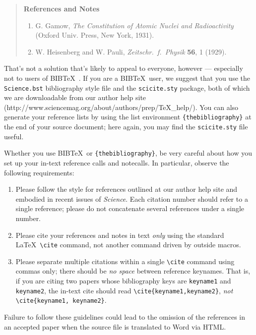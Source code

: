 \documentclass[12pt]{article}
\theoremstyle{plain}
\theoremstyle{definition}
\theoremstyle{remark}
\begin{document}
\begin{quote}
{\bf References and Notes}

\begin{enumerate}
\item G. Gamow, {\it The Constitution of Atomic Nuclei and
Radioactivity\/} (Oxford Univ. Press, New York, 1931).
\item W. Heisenberg and W. Pauli, {\it Zeitschr.\ f.\ Physik} {\bf 56},
1 (1929).
\end{enumerate}
\end{quote}

That's not a solution that's likely to appeal to everyone, however ---
especially not to users of B{\small{IB}}\TeX\ \cite{inclme}.  If you
are a B{\small{IB}}\TeX\ user, we suggest that you use the
\texttt{Science.bst} bibliography style file and the
\texttt{scicite.sty} package, both of which we are downloadable from our author help site
(http://www.sciencemag.org/about/authors/prep/TeX\_help/).  You can also
generate your reference lists by using the list environment
\texttt{\{thebibliography\}} at the end of your source document; here
again, you may find the \texttt{scicite.sty} file useful.

Whether you use B{\small{IB}}\TeX\ or \texttt{\{thebibliography\}}, be
very careful about how you set up your in-text reference calls and
notecalls.  In particular, observe the following requirements:

\begin{enumerate}
\item Please follow the style for references outlined at our author
  help site and embodied in recent issues of {\it Science}.  Each
  citation number should refer to a single reference; please do not
  concatenate several references under a single number.
\item Please cite your references and notes in text {\it only\/} using
  the standard \LaTeX\ \verb+\cite+ command, not another command
  driven by outside macros.
\item Please separate multiple citations within a single \verb+\cite+
  command using commas only; there should be {\it no space\/}
  between reference keynames.  That is, if you are citing two
  papers whose bibliography keys are \texttt{keyname1} and
  \texttt{keyname2}, the in-text cite should read
  \verb+\cite{keyname1,keyname2}+, {\it not\/}
  \verb+\cite{keyname1, keyname2}+.
\end{enumerate}

\noindent Failure to follow these guidelines could lead
to the omission of the references in an accepted paper when the source
file is translated to Word via HTML.
\end{document}
